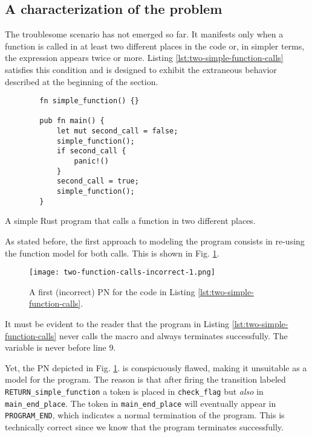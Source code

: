 \documentclass[../Thesis.tex]{subfiles}
\begin{document}
\subsection{A characterization of the problem}

The troublesome scenario has not emerged so far.
It manifests only when a function is called
in at least two different places in the code or,
in simpler terms, the expression  appears twice or more.
Listing \ref{lst:two-simple-function-calls} satisfies this condition
and is designed to exhibit
the extraneous behavior described at the beginning of the section.

\begin{listing}
    \begin{verbatim}
        fn simple_function() {}

        pub fn main() {
            let mut second_call = false;
            simple_function();
            if second_call {
                panic!()
            }
            second_call = true;
            simple_function();
        }
    \end{verbatim}
    \caption{A simple Rust program that calls a function in two different places.}
    \label{lst:two-simple-function-calls}
\end{listing}

As stated before, the first approach to modeling the program consists
in re-using the function model for both calls.
This is shown in Fig. \ref{fig:two-function-calls-incorrect-1}.

\begin{figure}[!htb]
    \centering
    \texttt{[image: two-function-calls-incorrect-1.png]}
    \caption{A first (incorrect) \acrshort{PN} for the code
        in Listing \ref{lst:two-simple-function-calls}.}
    \label{fig:two-function-calls-incorrect-1}
\end{figure}

It must be evident to the reader that
the program in Listing \ref{lst:two-simple-function-calls}
never calls the  macro and always terminates successfully.
The variable  is never  before line 9.

Yet, the \acrshort{PN} depicted in Fig. \ref{fig:two-function-calls-incorrect-1}.
is conspicuously flawed, making it unsuitable as a model for the program.
The reason is that after firing the transition labeled \texttt{RETURN\_simple\_function}
a token is placed in \texttt{check\_flag} but \emph{also} in \texttt{main\_end\_place}.
The token in \texttt{main\_end\_place} will eventually appear in \texttt{PROGRAM\_END},
which indicates a normal termination of the program.
This is technically correct since we know that the program terminates successfully.
\end{document}
